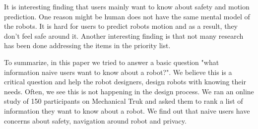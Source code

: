 \documentclass[letterpaper, 10 pt, conference]{ieeeconf}  %
\begin{document}
It is interesting finding that users mainly want to know about safety and motion prediction. One reason might be human does not have the same mental model of the robots. It is hard for users to predict robots motion and as a result, they don't feel safe around it. Another interesting finding is that not many research has been done addressing the items in the priority list.

To summarize, in this paper we tried to answer a basic question "what information naive users want to know about a robot?". We believe this is a critical question and help the robot designers, design robots with knowing their needs. Often, we see this is not happening in the design process.  We ran an online study of 150 participants on Mechanical Truk and asked them to rank a list of information they want to know about a robot. We find out that naive users have concerns about safety, navigation around robot and privacy.









\end{document}

